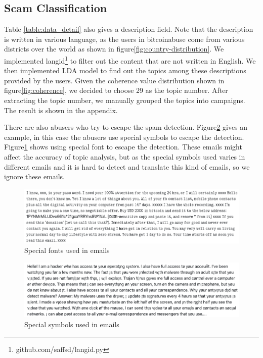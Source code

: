 \subsection{Scam Classification}
Table \ref{table:data_detail} also gives a description field. Note that the description is written in various language, as the users in bitcoinabuse come from various districts over the world as shown in figure\ref{fig:country-distribution}. We implemented langid\footnote{github.com/saffsd/langid.py} to filter out the content that are not written in English. We then implemented LDA model to find out the topics among these descriptions provided by the users. Given the coherence value distribution shown in figure\ref{fig:coherence}, we decided to choose 29 as the topic number. After extracting the topic number, we manually grouped the topics into campaigns. The result is shown in the appendix.

There are also abusers who try to escape the spam detection. Figure\ref{fig:special_symbol} gives an example, in this case the abusers use special symbols to escape the detection. Figure\ref{fig:special_font} shows using special font to escape the detection. These emails might affect the accuracy of topic analysis, but as the special symbols used varies in different emails and it is hard to detect and translate this kind of emails, so we ignore these emails.
\begin{figure}[tbp]
\centerline{\includegraphics[width=\columnwidth]{images/special_font.png}}
\caption{Special fonts used in emails}
\label{fig:special_font}
\end{figure}

\begin{figure}[tbp]
\centerline{\includegraphics[width=\columnwidth]{images/special_symbol.png}}
\caption{Special symbols used in emails}
\label{fig:special_symbol}
\end{figure}

